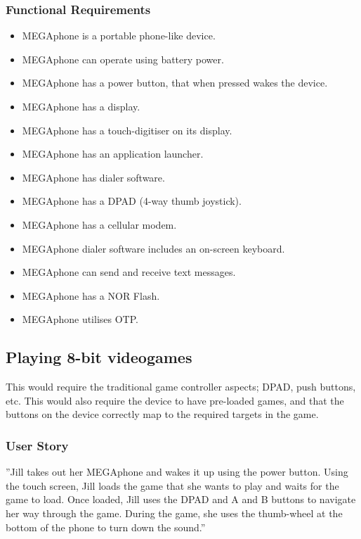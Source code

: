        \subsubsection{Functional Requirements}
        \begin{itemize}
        \item MEGAphone is a portable phone-like device.
        \item MEGAphone can operate using battery power.
        \item MEGAphone has a power button, that when pressed wakes the device.
        \item MEGAphone has a display.
        \item MEGAphone has a touch-digitiser on its display.
        \item MEGAphone has an application launcher.
        \item MEGAphone has dialer software.
        \item MEGAphone has a DPAD (4-way thumb joystick).
        \item MEGAphone has a cellular modem.
	\item MEGAphone dialer software includes an on-screen keyboard.
	\item MEGAphone can send and receive text messages.
	\item MEGAphone has a NOR Flash.
	\item MEGAphone utilises OTP.
        \end{itemize}

\subsection{Playing 8-bit videogames}
	This would require the traditional game controller aspects; DPAD, push buttons, etc. This would also require the device to have pre-loaded games, and that the buttons on the device correctly map to the required targets in the game.\\

	\subsubsection{User Story}
	''Jill takes out her MEGAphone and wakes it up using the power button. Using the touch screen, Jill loads the game that she wants to play and waits for the game to load. Once loaded, Jill uses the DPAD and A and B buttons to navigate her way through the game. During the game, she uses the thumb-wheel at the bottom of the phone to turn down the sound.''

